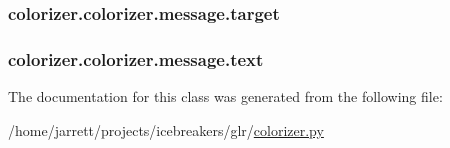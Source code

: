 \hypertarget{classcolorizer_1_1colorizer_1_1message_a65138371d307f600a3b682fda567ef80}{
\subsubsection[{target}]{\setlength{\rightskip}{0pt plus 5cm}colorizer.\-colorizer.\-message.\-target}}\label{classcolorizer_1_1colorizer_1_1message_a65138371d307f600a3b682fda567ef80}
\hypertarget{classcolorizer_1_1colorizer_1_1message_a49889a0d5e3bfe05ddfc0e84e2df9488}{
\subsubsection[{text}]{\setlength{\rightskip}{0pt plus 5cm}colorizer.\-colorizer.\-message.\-text}}\label{classcolorizer_1_1colorizer_1_1message_a49889a0d5e3bfe05ddfc0e84e2df9488}


The documentation for this class was generated from the following file\-:\begin{DoxyCompactItemize}
\item 
/home/jarrett/projects/icebreakers/glr/\hyperlink{colorizer_8py}{colorizer.\-py}\end{DoxyCompactItemize}
